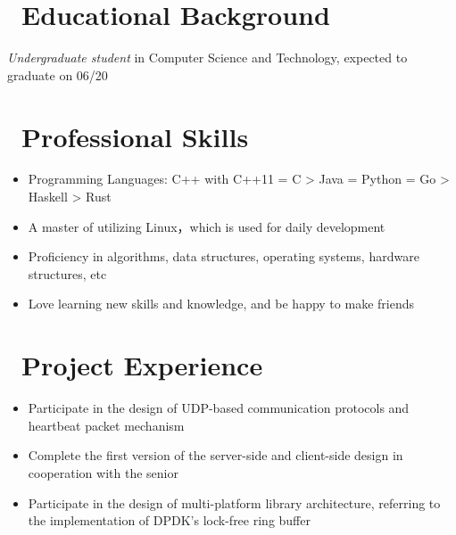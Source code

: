 \documentclass{resume}
\begin{document}



\section{\texorpdfstring{\faGraduationCap\ Educational Background}{Educational Background}}
\textit{Undergraduate student} in Computer Science and Technology, expected to graduate on 06/20

\section{\texorpdfstring{\faCogs\ Professional Skills}{Professional Skills}}
\begin{itemize}[parsep=0.5ex]
  \item Programming Languages: C++ with C++11 = C > Java = Python = Go > Haskell > Rust
  \item A master of utilizing Linux，which is used for daily development
  \item Proficiency in algorithms, data structures, operating systems, hardware structures, etc
  \item Love learning new skills and knowledge, and be happy to make friends
\end{itemize}

\section{\texorpdfstring{\faUsers\ Project Experience}{Project Experience}}
\begin{itemize}
  \item Participate in the design of UDP-based communication protocols and heartbeat packet mechanism
  \item Complete the first version of the server-side and client-side design in cooperation with the senior
  \item Participate in the design of multi-platform library architecture, referring to the implementation of DPDK's lock-free ring buffer
\end{itemize}
\end{document}
